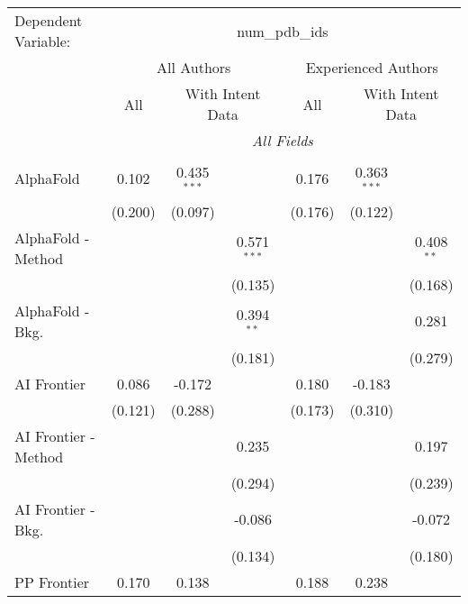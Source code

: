 \begingroup
\centering
\begin{tabular}{lcccccc}
   \tabularnewline \midrule \midrule
   Dependent Variable: & \multicolumn{6}{c}{num\_pdb\_ids}\\
 & \multicolumn{3}{c}{All Authors} & \multicolumn{3}{c}{Experienced Authors} \\
\cmidrule(lr){2-4} \cmidrule(lr){5-7}
 & \multicolumn{1}{c}{All} & \multicolumn{2}{c}{With Intent Data} & \multicolumn{1}{c}{All} & \multicolumn{2}{c}{With Intent Data} \\
\cmidrule(lr){2-2} \cmidrule(lr){3-4} \cmidrule(lr){5-5} \cmidrule(lr){6-7}
 & \multicolumn{6}{c}{\textit{All Fields}} \\ \\
   AlphaFold            & 0.102   & 0.435$^{***}$ &               & 0.176   & 0.363$^{***}$ &   \\   
                        & (0.200) & (0.097)       &               & (0.176) & (0.122)       &   \\   
   AlphaFold - Method   &         &               & 0.571$^{***}$ &         &               & 0.408$^{**}$\\   
                        &         &               & (0.135)       &         &               & (0.168)\\   
   AlphaFold - Bkg.     &         &               & 0.394$^{**}$  &         &               & 0.281\\   
                        &         &               & (0.181)       &         &               & (0.279)\\   
   AI Frontier          & 0.086   & -0.172        &               & 0.180   & -0.183        &   \\   
                        & (0.121) & (0.288)       &               & (0.173) & (0.310)       &   \\   
   AI Frontier - Method &         &               & 0.235         &         &               & 0.197\\   
                        &         &               & (0.294)       &         &               & (0.239)\\   
   AI Frontier - Bkg.   &         &               & -0.086        &         &               & -0.072\\   
                        &         &               & (0.134)       &         &               & (0.180)\\   
   PP Frontier          & 0.170   & 0.138         &               & 0.188   & 0.238         &   \\   

\end{tabular}
